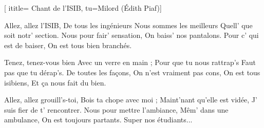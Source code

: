 [
ititle= {Chant de l'ISIB},
tu={Milord (Édith Piaf)}]

\beginverse
Allez, allez l'ISIB,
De tous les ingénieurs
Nous sommes les meilleurs
Quell' que soit notr' section.
Nous pour fair' sensation,
On baiss' nos pantalons.
Pour c' qui est de baiser,
On est tous bien branchés.
\endverse

\beginverse
Tenez, tenez-vous bien
Avec un verre en main ;
Pour que tu nous rattrap's
Faut pas que tu dérap's.
De toutes les façons,
On n'est vraiment pas cons,
On est tous isibiens,
Et ça nous fait du bien.
\endverse

\beginverse
Allez, allez grouill's-toi,
Bois ta chope avec moi ;
Maint'nant qu'elle est vidée,
J' suis fier de t' rencontrer.
Nous pour mettre l'ambiance,
Mêm' dans une ambulance,
On est toujours partants.
Super nos étudiants...
\endverse

\endsong
